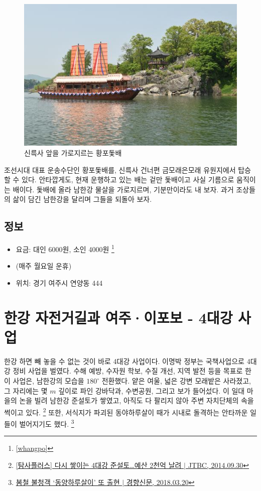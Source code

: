 \begin{figure}
    \centering
    \includegraphics[width=.6\textwidth]{img/황포돛배.jpg}
    \caption{신륵사 앞을 가로지르는 황포돛배\protect\footnotemark}
    \label{fig:my_labe6}
\end{figure}


조선시대 대표 운송수단인 황포돛배를, 신륵사 건너편 금모래은모래 유원지에서 탑승할 수 있다. 
안타깝게도, 현재 운행하고 있는 배는 겉만 돛배이고 사실 기름으로 움직이는 배이다.
돛배에 올라 남한강 물살을 가로지르며, 기분만이라도 내 보자.
과거 조상들의 삶이 담긴 남한강을 달리며 그들을 되돌아 보자.

\subsection{정보}
\begin{itemize}
    \item 요금: 대인 6000원, 소인 4000원 \footnote{\ref{whangpo}}
    \item (매주 월요일 운휴)
    \item 위치: 경기 여주시 연양동 444
\end{itemize}

\section{한강 자전거길과 여주·이포보 - 4대강 사업}

한강 하면 빼 놓을 수 없는 것이 바로 4대강 사업이다.
이명박 정부는 국책사업으로 4대강 정비 사업을 벌였다.
수해 예방, 수자원 학보, 수질 개선, 지역 발전 등을 목표로 한 이 사업은,
남한강의 모습을 $180^\circ$ 전환했다.
얕은 여울, 넓은 강변 모래밭은 사라졌고, 그 자리에는 몇 $m$ 깊이로 파인 강바닥과, 수변공원, 그리고 보가 들어섰다.
이 일대 마을의 논을 빌려 남한강 준설토가 쌓였고,
아직도 다 팔리지 않아 주변 자치단체의 속을 썩이고 있다.
\footnote{\href{https://news.jtbc.joins.com/article/article.aspx?news_id=NB10593178}{[탐사플러스] 다시 쌓이는 4대강 준설토…예산 2천억 날려 $|$ JTBC, 2014.09.30}}
또한, 서식지가 파괴된 동야하루살이 때가 시내로 돌격하는 안타까운 일들이 벌어지기도 했다.
\footnote{\href{http://news.khan.co.kr/kh_news/khan_art_view.html?artid=201803201448001&code=620109}{봄철 불청객 `동양하루살이' 또 출현 $|$ 경향신문, 2018.03.20}}

